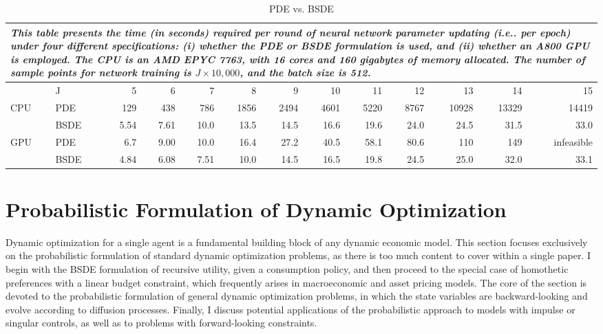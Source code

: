 \documentclass{article}
\begin{document}
\begin{table}[h]
\centering
\caption{PDE vs. BSDE}
\scriptsize
\begin{tabular}{@{}llrrrrrrrrrrr@{}}
\toprule
\multicolumn{13}{p{0.9\textwidth}}{\textit{This table presents the time (in seconds) required per round of neural network parameter updating (i.e.. per epoch) under four different specifications: (i) whether the PDE or BSDE formulation is used, and (ii) whether an A800 GPU is employed. The CPU is an AMD EPYC 7763, with 16 cores and 160 gigabytes of memory allocated. The number of sample points for network training is $J\times10,000$, and the batch size is 512.}} \\
\midrule
& J & 5 & 6 & 7 & 8 & 9 & 10 & 11 & 12 & 13 & 14 & 15 \\
\midrule
\multirow{2}{*}{CPU} & PDE & 129 & 438 & 786 & 1856 & 2494 & 4601 & 5220 & 8767 & 10928 & 13329 & 14419 \\
& BSDE & 5.54 & 7.61 & 10.0 & 13.5 & 14.5 & 16.6 & 19.6 & 24.0 & 24.5 & 31.5 & 33.0 \\
\midrule
\multirow{2}{*}{GPU} & PDE & 6.7 & 9.00 & 10.0 & 16.4 & 27.2 & 40.5 & 58.1 & 80.6 & 110 & 149 & infeasible \\
& BSDE & 4.84 & 6.08 & 7.51 & 10.0 & 14.5 & 16.5 & 19.8 & 24.5 & 25.0 & 32.0 & 33.1 \\
\bottomrule
\end{tabular}
\label{tab:2}
\end{table}

\section{Probabilistic Formulation of Dynamic Optimization}

Dynamic optimization for a single agent is a fundamental building block of any dynamic economic model. This section focuses exclusively on the probabilistic formulation of standard dynamic optimization problems, as there is too much content to cover within a single paper. I begin with the BSDE formulation of recursive utility, given a consumption policy, and then proceed to the special case of homothetic preferences with a linear budget constraint, which frequently arises in macroeconomic and asset pricing models. The core of the section is devoted to the probabilistic formulation of general dynamic optimization problems, in which the state variables are backward-looking and evolve according to diffusion processes. Finally, I discuss potential applications of the probabilistic approach to models with impulse or singular controls, as well as to problems with forward-looking constraints.
\end{document}
